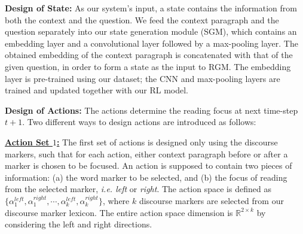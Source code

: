 
\textbf{Design of State:} As our system's input, a state contains the information from both the context and the question. %
We feed the context paragraph and the question separately into our state generation module (SGM), which contains an embedding layer and a convolutional layer followed by a max-pooling layer. The obtained embedding of the context paragraph is concatenated with that of the given question, in order to form a state as the input to RGM. The embedding layer is pre-trained using our dataset; the CNN and max-pooling layers are trained and updated together with our RL model. %
 
 \textbf{Design of Actions:} The actions determine the reading focus at next time-step $t+1$. 
 Two different ways to design actions are introduced as follows:
 
{\bf{ \underline{Action Set $1$:}}}
The first set of actions is designed only using the discourse markers, such that for each action, either context paragraph before or after a marker is chosen to be focused. An action is supposed to contain two pieces of information: (a) the word marker to be selected, and (b) the focus of reading from the selected marker, \emph{i.e. left} or \emph{right}. The action space is defined as $\lbrace\alpha_{1}^{left},\alpha_{1}^{right}, \cdots,\alpha_{k}^{left},\alpha_{k}^{right}\rbrace$, where $k$ discourse markers are selected from our discourse marker lexicon. The entire action space dimension is $\mathbb{R}^{2\times k}$ by considering the left and right directions. %

